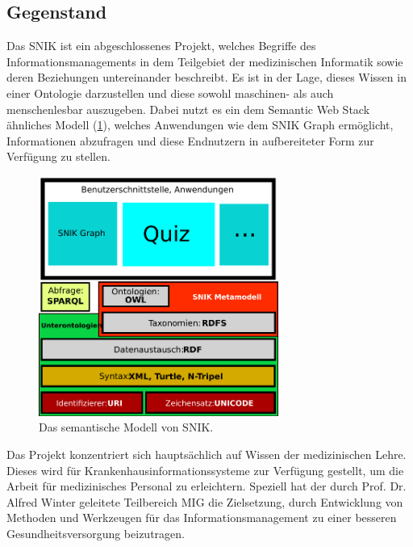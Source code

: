\documentclass[headsepline,titlepage,ngerman,twoside,12pt]{report}
\begin{document}
\subsection{Gegenstand}
\label{sub:Gegenstand}
Das \ac{SNIK} ist ein abgeschlossenes Projekt, welches Begriffe des Informationsmanagements in dem Teilgebiet der medizinischen Informatik sowie deren Beziehungen untereinander beschreibt.
Es ist in der Lage, dieses Wissen in einer Ontologie darzustellen und diese sowohl maschinen- als auch menschenlesbar auszugeben.
Dabei nutzt es ein dem Semantic Web Stack ähnliches Modell (\cref{img:semanticwebstack2}), welches Anwendungen wie dem \ac{SNIK} Graph ermöglicht, Informationen abzufragen und diese Endnutzern in aufbereiteter Form zur Verfügung zu stellen.
\begin{figure}
\centering
\includegraphics[width=0.7\textwidth]{images/swebstackde_snik.pdf}
\caption{Das semantische Modell von SNIK.}
\label{img:semanticwebstack2}
\end{figure}
Das Projekt konzentriert sich hauptsächlich auf Wissen der medizinischen Lehre. Dieses wird für Krankenhausinformationssysteme zur Verfügung gestellt, um die Arbeit für medizinisches Personal zu erleichtern. Speziell hat der durch Prof. Dr. Alfred Winter geleitete Teilbereich \ac{MIG} die Zielsetzung, durch Entwicklung von Methoden und Werkzeugen für das Informationsmanagement zu einer besseren Gesundheitsversorgung beizutragen.
\end{document}
